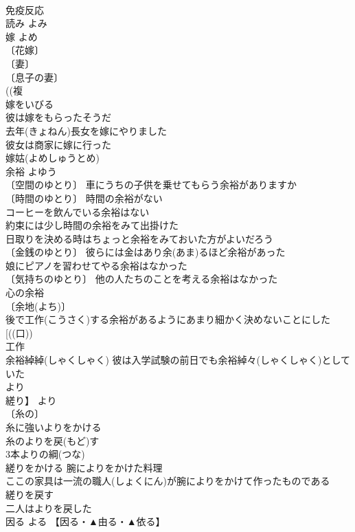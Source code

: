 \documentclass[8pt]{extreport}
\begin{document}
\begin{CJK}{UTF8}{min}
\\	免疫反応　
\\	読み	よみ	
\\	嫁	よめ	
\\	〔花嫁〕
\\	〔妻〕
\\	〔息子の妻〕
\\	((複
\\	嫁をいびる 
\\	彼は嫁をもらったそうだ 
\\	去年(きょねん)長女を嫁にやりました 
\\	彼女は商家に嫁に行った 
\\	嫁姑(よめしゅうとめ) 
\\	余裕	よゆう	
\\	〔空間のゆとり〕 車にうちの子供を乗せてもらう余裕がありますか 
\\	〔時間のゆとり〕 時間の余裕がない 
\\	コーヒーを飲んでいる余裕はない 
\\	約束には少し時間の余裕をみて出掛けた 
\\	日取りを決める時はちょっと余裕をみておいた方がよいだろう 
\\	〔金銭のゆとり〕 彼らには金はあり余(あま)るほど余裕があった 
\\	娘にピアノを習わせてやる余裕はなかった 
\\	〔気持ちのゆとり〕 他の人たちのことを考える余裕はなかった 
\\	心の余裕 
\\	〔余地(よち)〕
\\	後で工作(こうさく)する余裕があるようにあまり細かく決めないことにした 
\\	[((口))
\\	工作　
\\	余裕綽綽(しゃくしゃく) 彼は入学試験の前日でも余裕綽々(しゃくしゃく)としていた 
\\	より
\\	縒り】	より	
\\	〔糸の〕
\\	糸に強いよりをかける 
\\	糸のよりを戻(もど)す 
\\	3本よりの綱(つな) 
\\	縒りをかける 腕によりをかけた料理 
\\	ここの家具は一流の職人(しょくにん)が腕によりをかけて作ったものである 
\\	縒りを戻す 
\\	二人はよりを戻した 
\\	因る	よる	【因る・▲由る・▲依る】 

\end{CJK}
\end{document}
